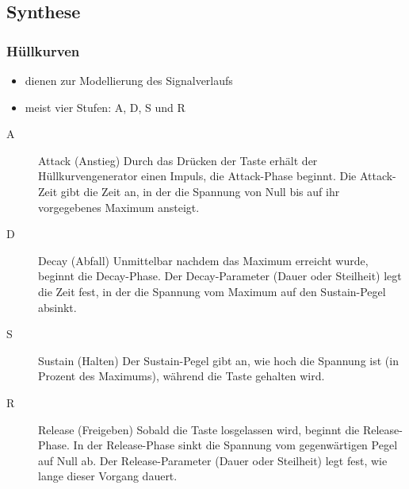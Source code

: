 \documentclass[11pt,ngerman]{beamer}
\begin{document}
\subsection{Synthese}

\begin{frame}
\frametitle{Hüllkurven}

\begin{itemize}
\item dienen zur Modellierung des Signalverlaufs
\item meist vier Stufen: A, D, S und R
\end{itemize}
 {\scriptsize
\begin{description}
\item[A] Attack (Anstieg) Durch das Drücken der Taste erhält der Hüllkurvengenerator einen Impuls, die Attack-Phase beginnt. Die Attack-Zeit gibt die Zeit an, in der die Spannung von Null bis auf ihr vorgegebenes Maximum ansteigt. 

\item[D] Decay (Abfall)  Unmittelbar nachdem das Maximum erreicht wurde, beginnt die Decay-Phase. Der Decay-Parameter (Dauer oder Steilheit) legt die Zeit fest, in der die Spannung vom Maximum auf den Sustain-Pegel absinkt.

\item[S] Sustain (Halten)  Der Sustain-Pegel gibt an, wie hoch die Spannung ist (in Prozent des Maximums), während die Taste gehalten wird. 

\item[R] Release (Freigeben) Sobald die Taste losgelassen wird, beginnt die Release-Phase. In der Release-Phase sinkt die Spannung vom gegenwärtigen Pegel auf Null ab. Der Release-Parameter (Dauer oder Steilheit) legt fest, wie lange dieser Vorgang dauert. 

\end{description}
}

\end{frame}
\end{document}
